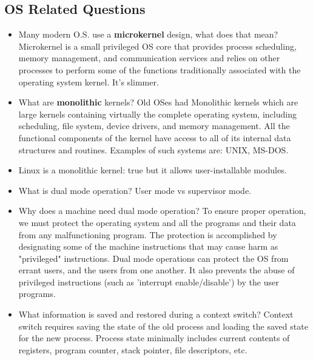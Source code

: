 \documentclass[fontsize=5pt]{scrartcl}
\begin{document}
\begin{multicols}{3}
    \subsection{OS Related Questions}
      \begin{itemize}
          \item Many modern O.S. use a \textbf{microkernel} design, what does that mean? Microkernel is a small privileged OS core that provides process
                scheduling, memory management, and communication services and relies on other processes to perform some of the functions 
                traditionally associated with the operating system kernel. It's slimmer.
          \item What are \textbf{monolithic} kernels? Old OSes had Monolithic kernels which are large kernels containing
                virtually the complete operating system, including scheduling, file 
                system, device drivers, and memory management.  All the functional
                components of the kernel have access to all of its internal data
                structures and routines. Examples of such systems are: UNIX, MS-DOS.
          \item Linux is a monolithic kernel: true but it allows user-installable modules.
          \item What is dual mode operation? User mode vs supervisor mode.
          \item Why does a machine need dual mode operation? To ensure proper operation, we must protect the operating system and all 
                the programs and their data from any malfunctioning program. 
                The protection is accomplished by designating some of the machine
                instructions that may cause harm as "privileged" instructions.
                Dual mode operations can protect the OS from errant users, and the users from one another. 
                It also prevents the abuse of privileged instructions (such as 'interrupt enable/disable')
                by the user programs.
          \item What information is saved and restored during a context switch? Context switch requires saving the state of the old process and
                loading the saved state for the new process. Process state
                minimally includes current contents of registers, program counter,
                stack pointer, file descriptors, etc. 


\end{itemize}
\end{multicols}
\end{document}
